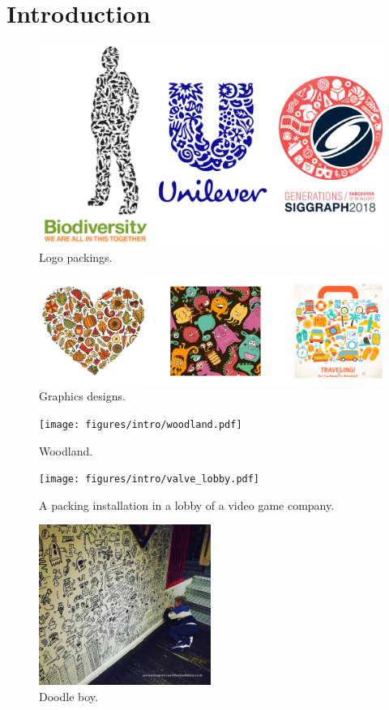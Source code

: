 
\chapter{Introduction}

\begin{figure}
\centering
\includegraphics[width=1.0\textwidth]{figures/intro/logos.pdf} 
\caption{\label{fig_logo_packings} 
Logo packings. }
\end{figure}

\begin{figure}
\centering
\includegraphics[width=1.0\textwidth]{figures/intro/graphics_designs.pdf} 
\caption{\label{fig_graphics_designs} 
Graphics designs. }
\end{figure}



\begin{figure}
\centering
\texttt{[image: figures/intro/woodland.pdf]} 
\caption{\label{fig_woodland} 
Woodland. }
\end{figure}

\begin{figure}
\centering
\texttt{[image: figures/intro/valve\_lobby.pdf]} 
\caption{\label{fig_valve_lobby} 
A packing installation in a lobby of a video game company. }
\end{figure}

\begin{figure}
\centering
\includegraphics[width=0.5\textwidth]{figures/intro/doodle_boy.pdf} 
\caption{\label{fig_doodle_boy} 
Doodle boy. }
\end{figure}




